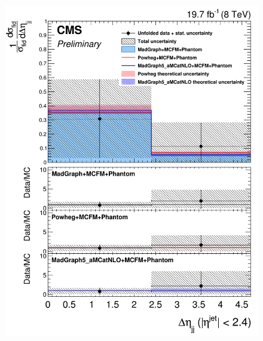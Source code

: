 \begin{figure}[hbtp]
  \begin{center}
    \includegraphics[width=\cmsFigWidth]{Figures/DiffCrossSecZZTo4mCentralDeta_Unfolded_fr_MadGraph_norm.png}     

\end{center}
\end{figure}
